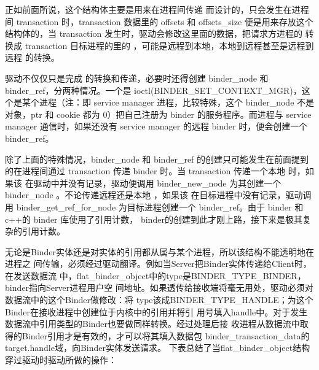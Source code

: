 \documentclass[a4paper,11pt]{article}
\begin{document}
正如前面所说，这个结构体主要是用来在进程间传递 \binder
而设计的，只会发生在进程间 transaction 时，transaction 数据里的 offsets 和
offsets_size 便是用来存放这个结构体的，当 transaction
发生时，驱动会修改这里面的数据，把请求方进程的 \binder 转换成 transaction
目标进程的里的 \binder，可能是远程到本地，本地到远程甚至是远程到远程 \binder
的转换。


驱动不仅仅只是完成 \binder 的转换和传递，必要时还得创建 binder_node 和
binder_ref，分两种情况。一个是
ioctl(BINDER_SET_CONTEXT_MGR)，这个是某个进程（注：即 service manager
进程，比较特殊，这个 binder_node 不是对象，ptr 和 cookie 都为 0）把自己注册为
binder 的服务程序。而进程与 service manager
通信时，如果还没有 service manager 的远程 binder 时，便会创建一个binder_ref。

除了上面的特殊情况，binder_node 和 binder_ref
的创建只可能发生在前面提到的在进程间通过 transaction 传递 binder 时。当
transaction 传递一个本地 \binder 时，如果该 \binder
在驱动中并没有记录，驱动便调用 binder_new_node 为其创建一个 binder_node
。不论传递远程还是本地 \binder，如果该 \binder 在目标进程中没有记录，驱动调用
binder_get_ref_for_node 为目标进程创建一个 binder_ref。由于 binder 和c++的
binder 库使用了引用计数， binder的创建到此才刚上路，接下来是极其复杂的引用计数。

无论是Binder实体还是对实体的引用都从属与某个进程，所以该结构不能透明地在进程之
间传输，必须经过驱动翻译。例如当Server把Binder实体传递给Client时，在发送数据流
中，flat_binder_object中的type是BINDER_TYPE_BINDER，binder指向Server进程用户空
间地址。如果透传给接收端将毫无用处，驱动必须对数据流中的这个Binder做修改：将
type该成BINDER_TYPE_HANDLE；为这个Binder在接收进程中创建位于内核中的引用并将引
用号填入handle中。对于发生数据流中引用类型的Binder也要做同样转换。经过处理后接
收进程从数据流中取得的Binder引用才是有效的，才可以将其填入数据包
binder_transaction_data的target.handle域，向Binder实体发送请求。
下表总结了当flat_binder_object结构穿过驱动时驱动所做的操作：
\end{document}
